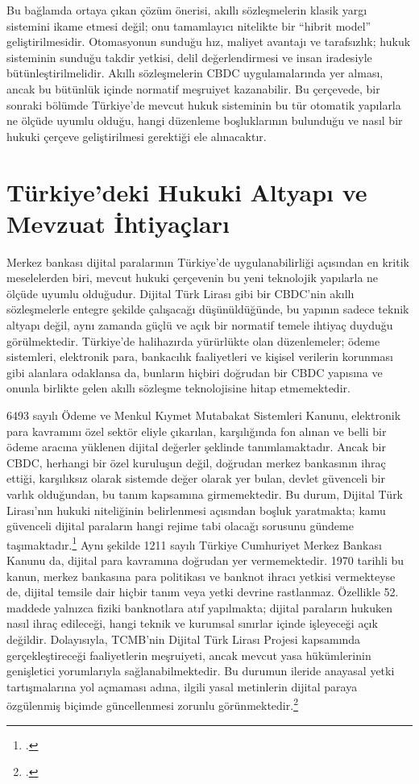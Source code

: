 \documentclass[a4paper,12pt]{article}
\begin{document}
Bu bağlamda ortaya çıkan çözüm önerisi, akıllı sözleşmelerin klasik yargı sistemini ikame etmesi değil; onu tamamlayıcı nitelikte bir “hibrit model” geliştirilmesidir. Otomasyonun sunduğu hız, maliyet avantajı ve tarafsızlık; hukuk sisteminin sunduğu takdir yetkisi, delil değerlendirmesi ve insan iradesiyle bütünleştirilmelidir. Akıllı sözleşmelerin CBDC uygulamalarında yer alması, ancak bu bütünlük içinde normatif meşruiyet kazanabilir. Bu çerçevede, bir sonraki bölümde Türkiye’de mevcut hukuk sisteminin bu tür otomatik yapılarla ne ölçüde uyumlu olduğu, hangi düzenleme boşluklarının bulunduğu ve nasıl bir hukuki çerçeve geliştirilmesi gerektiği ele alınacaktır.

\section{Türkiye’deki Hukuki Altyapı ve Mevzuat İhtiyaçları}

Merkez bankası dijital paralarının Türkiye’de uygulanabilirliği açısından en kritik meselelerden biri, mevcut hukuki çerçevenin bu yeni teknolojik yapılarla ne ölçüde uyumlu olduğudur. Dijital Türk Lirası gibi bir CBDC’nin akıllı sözleşmelerle entegre şekilde çalışacağı düşünüldüğünde, bu yapının sadece teknik altyapı değil, aynı zamanda güçlü ve açık bir normatif temele ihtiyaç duyduğu görülmektedir. Türkiye’de halihazırda yürürlükte olan düzenlemeler; ödeme sistemleri, elektronik para, bankacılık faaliyetleri ve kişisel verilerin korunması gibi alanlara odaklansa da, bunların hiçbiri doğrudan bir CBDC yapısına ve onunla birlikte gelen akıllı sözleşme teknolojisine hitap etmemektedir.

6493 sayılı Ödeme ve Menkul Kıymet Mutabakat Sistemleri Kanunu, elektronik para kavramını özel sektör eliyle çıkarılan, karşılığında fon alınan ve belli bir ödeme aracına yüklenen dijital değerler şeklinde tanımlamaktadır. Ancak bir CBDC, herhangi bir özel kuruluşun değil, doğrudan merkez bankasının ihraç ettiği, karşılıksız olarak sistemde değer olarak yer bulan, devlet güvenceli bir varlık olduğundan, bu tanım kapsamına girmemektedir. Bu durum, Dijital Türk Lirası'nın hukuki niteliğinin belirlenmesi açısından boşluk yaratmakta; kamu güvenceli dijital paraların hangi rejime tabi olacağı sorusunu gündeme taşımaktadır.\footcite{mas2023orchid} Aynı şekilde 1211 sayılı Türkiye Cumhuriyet Merkez Bankası Kanunu da, dijital para kavramına doğrudan yer vermemektedir. 1970 tarihli bu kanun, merkez bankasına para politikası ve banknot ihracı yetkisi vermekteyse de, dijital temsile dair hiçbir tanım veya yetki devrine rastlanmaz. Özellikle 52. maddede yalnızca fiziki banknotlara atıf yapılmakta; dijital paraların hukuken nasıl ihraç edileceği, hangi teknik ve kurumsal sınırlar içinde işleyeceği açık değildir. Dolayısıyla, TCMB'nin Dijital Türk Lirası Projesi kapsamında gerçekleştireceği faaliyetlerin meşruiyeti, ancak mevcut yasa hükümlerinin genişletici yorumlarıyla sağlanabilmektedir. Bu durumun ileride anayasal yetki tartışmalarına yol açmaması adına, ilgili yasal metinlerin dijital paraya özgülenmiş biçimde güncellenmesi zorunlu görünmektedir.\footcite{ecb2023digital}
\end{document}
